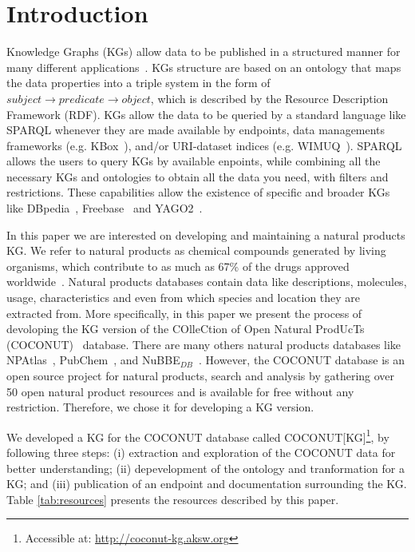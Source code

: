 \documentclass[
]{ceurart}
\begin{document}
\section{Introduction}

Knowledge Graphs (KGs) allow data to be published in a structured manner for many different applications~\cite{hogan2021knowledge}.
KGs structure are based on an ontology that maps the data properties into a triple system in the form of $subject \rightarrow predicate \rightarrow object$, which is described by the Resource Description Framework (RDF).
KGs allow the data to be queried by a standard language like SPARQL whenever they are made available by endpoints, data managements frameworks (e.g. KBox~\cite{marx2017kbox}), and/or URI-dataset indices (e.g. WIMUQ~\cite{valdestilhas2019more}).
SPARQL allows the users to query KGs by available enpoints, while combining all the necessary KGs and ontologies to obtain all the data you need, with filters and restrictions.
These capabilities allow the existence of specific and broader KGs like DBpedia~\cite{lehmann2015dbpedia}, Freebase~\cite{bollacker2008freebase} and YAGO2~\cite{hoffart2013yago2}.

In this paper we are interested on developing and maintaining a natural products KG.
We refer to natural products as chemical compounds generated by living organisms, which contribute to as much as 67\% of the drugs approved worldwide~\cite{newman2016natural}.
Natural products databases contain data like descriptions, molecules, usage, characteristics and even from which species and location they are extracted from.
More specifically, in this paper we present the process of devoloping the KG version of the COlleCtion of Open Natural ProdUcTs (COCONUT)~\cite{sorokina2021coconut} database.
There are many others natural products databases like NPAtlas~\cite{van2019natural,van2022natural}, PubChem~\cite{kim2023pubchem}, and NuBBE$_{DB}$~\cite{valli2013development,pilon2017nubbedb}.
However, the COCONUT database is an open source project for natural products, search and analysis by gathering over 50 open natural product resources and is available for free without any restriction.
Therefore, we chose it for developing a KG version.

We developed a KG for the COCONUT database called COCONUT[KG]\footnote{Accessible at: \url{http://coconut-kg.aksw.org}}, by following three steps: (i) extraction and exploration of the COCONUT data for better understanding; (ii) depevelopment of the ontology and tranformation for a KG; and (iii) publication of an endpoint and documentation surrounding the KG.
Table \ref{tab:resources} presents the resources described by this paper.
\end{document}
